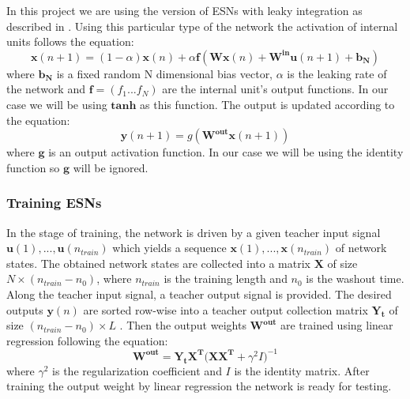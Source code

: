 \documentclass[a4paper,11pt,oneside]{article}
\begin{document}
In this project we are using the version of ESNs with leaky integration as described in \cite{jaeg8}. 
Using this particular type of the network the activation of internal units follows the equation:
\begin{equation}\label{esn:1}
\mathbf{x}(n+1) = (1-\alpha)\mathbf{x}(n) +  \alpha\mathbf{f}(\mathbf{Wx}(n) +\mathbf{W^{in}u}(n+1) + \mathbf{b_N})
\end{equation}
where $\mathbf{b_N}$ is a fixed random N dimensional bias vector, $\alpha$ is the leaking rate of the network and $\mathbf{f}=(f_1...f_N)$ are the internal unit's output functions. In our case we will be using $\mathbf{tanh}$ as this function. The output is updated according to the equation:
\begin{equation}\label{esn:2}
\mathbf{y}(n+1) = g(\mathbf{W^{out}}\mathbf{x}(n+1)) 
\end{equation}
where $\mathbf{g}$ is an output activation function. In our case we will be using the identity function so 
$\mathbf{g}$ will be ignored. 
\subsubsection*{Training ESNs}
In the stage of training, the network is driven by a given teacher input signal 
$\mathbf{u}(1),...,\mathbf{u}(n_{train})$ which yields a sequence $\mathbf{x}(1),...,\mathbf{x}(n_{train})$ of 
network states. The obtained network states are collected into a matrix $\mathbf{X}$ of size 
$N\times (n_{train}-n_0)$, where $n_{train}$ is the training length and $n_0$ is the washout time. 
Along the teacher input signal, a teacher output signal is provided. The desired outputs $\mathbf{y}(n)$ 
are sorted row-wise into a teacher output collection matrix $\mathbf{Y_t}$ of size $(n_{train}-n_0)\times L$ \cite{spedia}. 
Then the output weights $\mathbf{W^{out}}$ are trained using linear regression following the equation:
\begin{equation}\label{esn:3}
\mathbf{W^{out}=Y_tX^T(XX^T} + \gamma^2I)^{-1}
\end{equation}
where $\gamma^2$ is the regularization coefficient and $I$ is the identity matrix. 
After training the output weight by linear regression the network is ready for testing.
\end{document}
